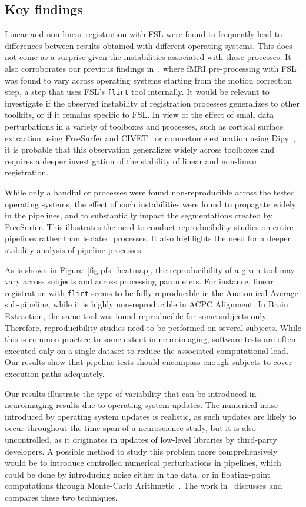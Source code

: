 \documentclass[a4paper,num-refs]{oup-contemporary}
\newcommand{\flirt}[0]{\texttt{flirt}\xspace}
\begin{document}
\subsection{Key findings}
Linear and non-linear registration with FSL were found to
frequently lead to differences between results obtained with different
operating systems. This does not come as a surprise given the instabilities
associated with these processes. It also corroborates our previous findings
in~\cite{Glatard2015}, where fMRI pre-processing with FSL was found to vary across operating systems 
starting from the motion
correction step, a step that uses FSL's \flirt tool internally. It
would be relevant to investigate if the observed instability of
registration processes generalizes to other toolkits, or if it remains specific
to FSL. In view of the effect of small data perturbations in a variety of
toolboxes and processes, such as cortical surface extraction using
FreeSurfer and CIVET~\cite{Lewis2017-ll} or connectome estimation using
Dipy~\cite{kiar2019comparing}, it is probable that this observation
generalizes widely across toolboxes and requires a deeper investigation of
the stability of linear and non-linear registration.

While only a handful or processes were found non-reproducible across the
tested operating systems, the effect of such instabilities were found to
propagate widely in the pipelines, and to substantially impact the segmentations
created by FreeSurfer. This illustrates the need to conduct reproducibility studies
on entire pipelines rather than isolated processes. It also highlights the need 
for a deeper stability analysis of pipeline processes.

As is shown in Figure~\ref{fig:pfs_heatmap}, the reproducibility of
a given tool may vary across subjects and across processing parameters. For
instance, linear registration with \flirt seems to be fully reproducible in
the Anatomical Average sub-pipeline, while it is highly non-reproducible in
ACPC Alignment. In Brain Extraction, the same tool was found reproducible
for some subjects only. Therefore, reproducibility studies need to be
performed on several subjects. While this is common practice to some extent in neuroimaging, 
software tests are often executed only on a single dataset to reduce the
associated computational load. Our results show that pipeline tests should 
encompass enough subjects to cover execution paths adequately.

Our results illustrate the type of variability that can be introduced in
 neuroimaging results due to operating system updates. The
 numerical noise introduced by operating system updates is realistic, as
 such updates are likely to occur throughout the time span of a
 neuroscience study, but it is also uncontrolled, as it originates in
 updates of low-level libraries by third-party developers. A possible
 method to study this problem more comprehensively would be to introduce
 controlled numerical perturbations in pipelines, which could be done by
 introducing noise either in the data, or in floating-point computations
 through Monte-Carlo Arithmetic~\cite{Parker1997-qq}. The work
 in~\cite{kiar2019comparing} discusses and compares these two techniques.
\end{document}
